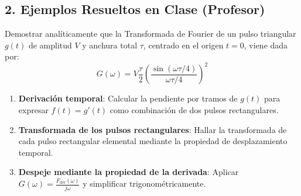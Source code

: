 \newpage
\subsection*{2. Ejemplos Resueltos en Clase (Profesor)}

\begin{problema}
Demostrar analíticamente que la Transformada de Fourier de un pulso triangular $g(t)$ de amplitud $V$ y anchura total $\tau$, centrado en el origen $t=0$, viene dada por:
\[
G(\omega) = V \frac{\tau}{2} \left( \frac{\sin(\omega\tau/4)}{\omega\tau/4} \right)^2
\]
\end{problema}

\begin{mecanizado}
\begin{enumerate}
    \item \textbf{Derivación temporal}: Calcular la pendiente por tramos de $g(t)$ para expresar $f(t) = g'(t)$ como combinación de dos pulsos rectangulares.
    \item \textbf{Transformada de los pulsos rectangulares}: Hallar la transformada de cada pulso rectangular elemental mediante la propiedad de desplazamiento temporal.
    \item \textbf{Despeje mediante la propiedad de la derivada}: Aplicar $G(\omega) = \frac{F_{\text{der}}(\omega)}{j\omega}$ y simplificar trigonométricamente.
\end{enumerate}
\end{mecanizado}

